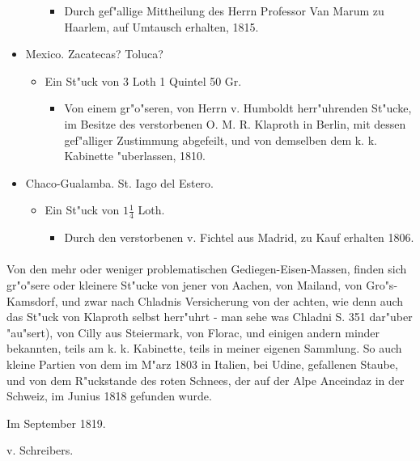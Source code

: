 \documentclass[a4paper, 11pt, oneside, polutonikogreek, german]{article}
\begin{document}
\begin{itemize}
\begin{itemize}
\begin{itemize}
            \item Durch gef"allige Mittheilung des Herrn Professor Van Marum zu Haarlem, auf Umtausch erhalten, 1815.
        \end{itemize}
    \end{itemize}
    \item Mexico. Zacatecas? Toluca?
    \begin{itemize}
        \item Ein St"uck von 3 Loth 1 Quintel 50 Gr.
        \begin{itemize}
            \item Von einem gr"o"seren, von Herrn v. Humboldt herr"uhrenden St"ucke, im Besitze des verstorbenen O. M. R. Klaproth in Berlin, mit dessen gef"alliger Zustimmung abgefeilt, und von demselben dem k. k. Kabinette "uberlassen, 1810.
        \end{itemize}
    \end{itemize}
    \item Chaco-Gualamba. St. Iago del Estero.
    \begin{itemize}
        \item Ein St"uck von $\mathfrak{1\frac{1}{4}}$ Loth.
        \begin{itemize}
            \item Durch den verstorbenen v. Fichtel aus Madrid, zu Kauf erhalten 1806.
        \end{itemize}
    \end{itemize}
\end{itemize}
\paragraph{}
Von den mehr oder weniger problematischen Gediegen-Eisen-Massen, finden sich gr"o"sere oder kleinere St"ucke von jener von Aachen, von Mailand, von Gro"s-Kamsdorf, und zwar nach Chladnis Versicherung von der achten, wie denn auch das St"uck von Klaproth selbst herr"uhrt - man sehe was Chladni S. 351 dar"uber "au"sert), von Cilly aus Steiermark, von Florac, und einigen andern minder bekannten, teils am k. k. Kabinette, teils in meiner eigenen Sammlung. So auch kleine Partien von dem im M"arz 1803 in Italien, bei Udine, gefallenen Staube, und von dem R"uckstande des roten Schnees, der auf der Alpe Anceindaz in der Schweiz, im Junius 1818 gefunden wurde.

Im September 1819.

\hfill\begin{minipage}{0.45\linewidth}
v. Schreibers.
\end{minipage}
\clearpage
\end{document}
